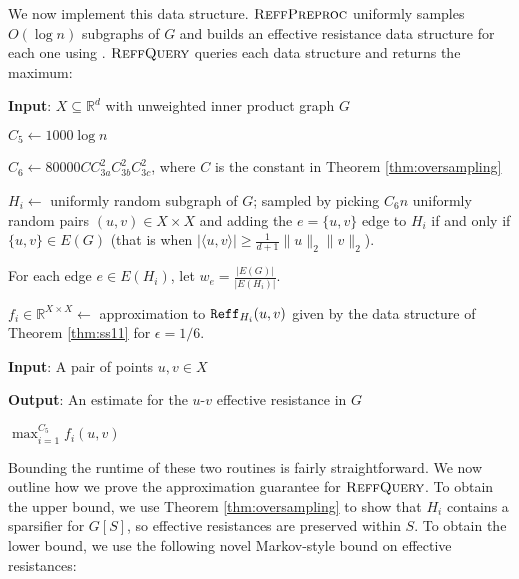 We now implement this data structure. $\textsc{ReffPreproc}$ uniformly samples $O(\log n)$ subgraphs of $G$ and builds an effective resistance data structure for each one using \cite{ss11}. $\textsc{ReffQuery}$ queries each data structure and returns the maximum:

\begin{algorithm}[!ht]
\begin{algorithmic}[1]

    \State \textbf{Input}: $X\subseteq \mathbb{R}^d$ with unweighted inner product graph $G$
    
    \State $C_5\gets 1000\log n$
    
    \State $C_6\gets 80000CC_{3a}^2 C_{3b}^2 C_{3c}^2$, where $C$ is the constant in Theorem \ref{thm:oversampling}
    
    
        \State $H_i\gets $ uniformly random subgraph of $G$; sampled by picking $C_6 n$ uniformly random pairs $(u,v)\in X\times X$ and adding the $e = \{u,v\}$ edge to $H_i$ if and only if $\{u,v\}\in E(G)$ (that is when $|\langle u,v\rangle|\ge \frac{1}{d+1} \|u\|_2 \|v\|_2$).
        
        \State For each edge $e\in E(H_i)$, let $w_e = \frac{|E(G)|}{|E(H_i)|}$.
        
        \State $f_i\in \mathbb{R}^{X\times X}\gets$ approximation to $\mathtt{Reff}_{H_i}(u,v)$ given by the data structure of Theorem \ref{thm:ss11} for $\epsilon = 1/6$.
    
    \EndFor
    
\EndProcedure
{}

    \State \textbf{Input}: A pair of points $u,v\in X$
    
    \State \textbf{Output}: An estimate for the $u$-$v$ effective resistance in $G$
    
    \State \Return $\max_{i=1}^{C_5} f_i(u,v)$
    
\EndProcedure
\end{algorithmic}
\end{algorithm}

Bounding the runtime of these two routines is fairly straightforward. We now outline how we prove the approximation guarantee for $\textsc{ReffQuery}$. To obtain the upper bound, we use Theorem \ref{thm:oversampling} to show that $H_i$ contains a sparsifier for $G[S]$, so effective resistances are preserved within $S$. To obtain the lower bound, we use the following novel Markov-style bound on effective resistances:

